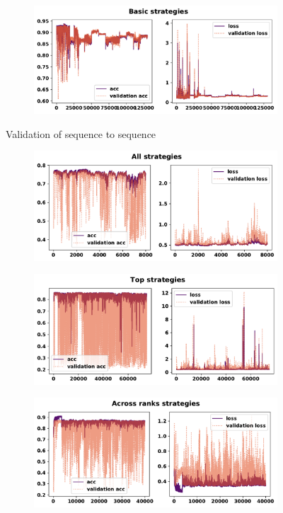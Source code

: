\begin{figure}[!htbp]
\begin{subfigure}{\textwidth}
    \centering
    \includegraphics[width=.8\textwidth]{src/chapters/07/img/validation_plot_basic_strategies.pdf}
    \end{subfigure}
    \caption{Validation of sequence to sequence}\label{fig:validation_sequence_to_sequence}
\end{figure}

\begin{figure}[!htbp]
    \begin{subfigure}{\textwidth}
    \centering
    \includegraphics[width=.8\textwidth]{src/chapters/07/img/validation_plot_classification_all_strategies.pdf}
    \end{subfigure}\hfill
    \begin{subfigure}{\textwidth}
    \centering
    \includegraphics[width=.8\textwidth]{src/chapters/07/img/validation_plot_classification_top_strategies.pdf}
    \end{subfigure}
    \begin{subfigure}{\textwidth}
    \centering
    \includegraphics[width=.8\textwidth]{src/chapters/07/img/validation_plot_classification_across_ranks_strategies.pdf}

\end{subfigure}
\end{figure}
